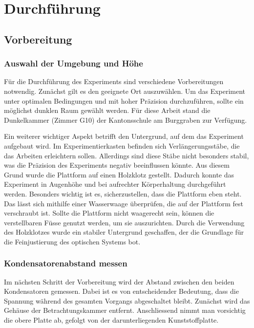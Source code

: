 \chapter{Durchführung}\label{cha:durchfuehrung}
\section{Vorbereitung}\label{sec:vorbereitung}
\subsection{Auswahl der Umgebung und Höhe}\label{sub:auswahlUmgebung}
Für die Durchführung des Experiments sind verschiedene Vorbereitungen notwendig. Zunächst gilt es den geeignete Ort auszuwählen. Um das Experiment unter optimalen Bedingungen und mit hoher Präzision durchzuführen, sollte ein möglichst dunklen Raum gewählt werden. Für diese Arbeit stand die Dunkelkammer (Zimmer G10) der Kantonsschule am Burggraben zur Verfügung.

Ein weiterer wichtiger Aspekt betrifft den Untergrund, auf dem das Experiment aufgebaut wird. Im Experimentierkasten befinden sich Verlängerungsstäbe, die das Arbeiten erleichtern sollen. Allerdings sind diese Stäbe nicht besonders stabil, was die Präzision des Experiments negativ beeinflussen könnte. Aus diesem Grund wurde die Plattform auf einen Holzklotz gestellt. Dadurch konnte das Experiment in Augenhöhe und bei aufrechter Körperhaltung durchgeführt werden. Besonders wichtig ist es, sicherzustellen, dass die Plattform eben steht. Das lässt sich mithilfe einer Wasserwaage überprüfen, die auf der Plattform fest verschraubt ist. Sollte die Plattform nicht waagerecht sein, können die verstellbaren Füsse genutzt werden, um sie auszurichten. Durch die Verwendung des Holzklotzes wurde ein stabiler Untergrund geschaffen, der die Grundlage für die Feinjustierung des optischen Systems bot.

\subsection{Kondensatorenabstand messen}\label{sub:kondensatorenabstand}
Im nächsten Schritt der Vorbereitung wird der Abstand zwischen den beiden Kondensatoren gemessen. Dabei ist es von entscheidender Bedeutung, dass die Spannung während des gesamten Vorgangs abgeschaltet bleibt. Zunächst wird das Gehäuse der Betrachtungskammer entfernt. Anschliessend nimmt man vorsichtig die obere Platte ab, gefolgt von der darunterliegenden Kunststoffplatte.

